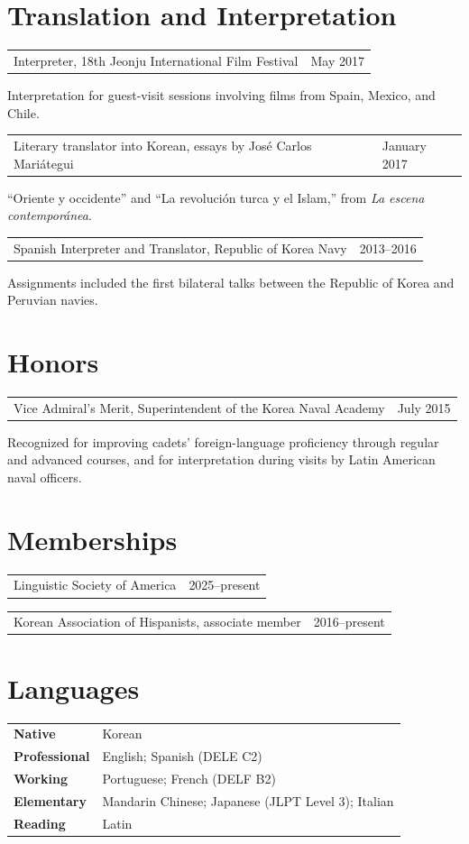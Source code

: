 \documentclass[10pt,letterpaper]{article}
\makeatletter
\newcommand{\datedentry}[2]{%
  \noindent\begin{tabularx}{\textwidth}{@{}X>{\raggedleft\arraybackslash}p{1.45in}@{}}
    #1 & \textcolor{muted}{#2}
  \end{tabularx}\par
}
\newcommand{\subentry}[1]{%
  \hspace*{0.9em}\begin{minipage}{\dimexpr\textwidth-0.9em\relax}
    \small #1
  \end{minipage}\par
}
\makeatother
\begin{document}
\section{Translation and Interpretation}

\datedentry{Interpreter, 18th Jeonju International Film Festival}{May 2017}
\subentry{Interpretation for guest-visit sessions involving films from Spain, Mexico, and Chile.}

\datedentry{Literary translator into Korean, essays by José Carlos Mariátegui}{January 2017}
\subentry{``Oriente y occidente'' and ``La revolución turca y el Islam,'' from \textit{La escena contemporánea}.}

\datedentry{Spanish Interpreter and Translator, Republic of Korea Navy}{2013--2016}
\subentry{Assignments included the first bilateral talks between the Republic of Korea and Peruvian navies.}

\section{Honors}

\datedentry{Vice Admiral's Merit, Superintendent of the Korea Naval Academy}{July 2015}
\subentry{Recognized for improving cadets' foreign-language proficiency through regular and advanced courses, and for interpretation during visits by Latin American naval officers.}

\section{Memberships}

\datedentry{Linguistic Society of America}{2025--present}
\datedentry{Korean Association of Hispanists, associate member}{2016--present}

\section{Languages}

\begin{tabularx}{\textwidth}{@{}>{\bfseries}p{1.25in}X@{}}
Native & Korean \\
Professional & English; Spanish (DELE C2) \\
Working & Portuguese; French (DELF B2) \\
Elementary & Mandarin Chinese; Japanese (JLPT Level 3); Italian \\
Reading & Latin
\end{tabularx}
\end{document}
